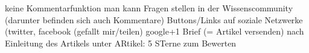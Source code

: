 keine Kommentarfunktion
man kann Fragen stellen in der Wissenscommunity (darunter befinden sich auch Kommentare)
Buttons/Links auf soziale Netzwerke (twitter, facebook (gefallt mir/teilen) google+1
Brief (= Artikel versenden)
nach Einleitung des Artikels
unter ARtikel: 5 STerne zum Bewerten